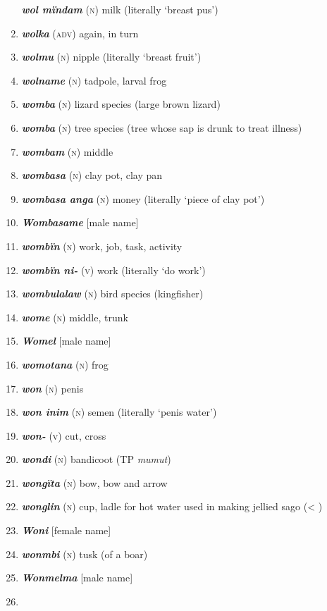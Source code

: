 \begin{enumerate}[noitemsep, label={}, align=left, widest=190, labelsep=1ex,leftmargin=*,itemindent=-10pt]
\textbf{\textit{wol mïndam}} (\textsc{n}) milk (literally ‘breast pus’) \item 
\textbf{\textit{wolka}} (\textsc{adv)} again, in turn \item 
\textbf{\textit{wolmu}} (\textsc{n}) nipple (literally ‘breast fruit’) \item 
\textbf{\textit{wolname}} (\textsc{n}) tadpole, larval frog \item 
\textbf{\textit{womba}} (\textsc{n}) lizard species (large brown lizard) \item 
\textbf{\textit{womba}} (\textsc{n}) tree species (tree whose sap is drunk to treat illness) \item 
\textbf{\textit{wombam}} (\textsc{n}) middle \item 
\textbf{\textit{wombasa}} (\textsc{n}) clay pot, clay pan \item 
\textbf{\textit{wombasa anga}} (\textsc{n}) money (literally ‘piece of clay pot’) \item 
\textbf{\textit{Wombasame}} [male name] \item 
\textbf{\textit{wombïn}} (\textsc{n}) work, job, task, activity \item 
\textbf{\textit{wombïn ni-}} (\textsc{v}) work (literally ‘do work’) \item 
\textbf{\textit{wombulalaw}} (\textsc{n}) bird species (kingfisher) \item 
\textbf{\textit{wome}} (\textsc{n}) middle, trunk \item 
\textbf{\textit{Womel}} [male name] \item 
\textbf{\textit{womotana}} (\textsc{n}) frog \item 
\textbf{\textit{won}} (\textsc{n}) penis \item 
\textbf{\textit{won inim}} (\textsc{n}) semen (literally ‘penis water’) \item 
\textbf{\textit{won-}} (\textsc{v}) cut, cross \item 
\textbf{\textit{wondi}} (\textsc{n}) bandicoot (TP \textit{mumut}) \item 
\textbf{\textit{wongïta}} (\textsc{n}) bow, bow and arrow \item 
\textbf{\textit{wonglin}} (\textsc{n}) cup, ladle for hot water used in making jellied sago (< ) \item 
\textbf{\textit{Woni}} [female name] \item 
\textbf{\textit{wonmbi}} (\textsc{n}) tusk (of a boar) \item 
\textbf{\textit{Wonmelma}} [male name] \item 

\end{enumerate}
